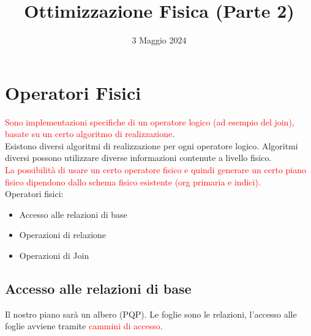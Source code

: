 \documentclass[12pt]{article}
\title{Ottimizzazione Fisica (Parte 2)}
\date{3 Maggio 2024}
\begin{document}
\maketitle
\section{Operatori Fisici}
\textcolor{red}{Sono implementazioni specifiche di un operatore
logico (ad esempio del join), basate su un certo
algoritmo di realizzazione}.\\ Esistono diversi algoritmi di realizzazione per ogni operatore logico. Algoritmi diversi possono utilizzare diverse informazioni contenute a livello fisico.\\
\textcolor{red}{La possibilità di usare un certo operatore fisico e quindi generare un certo piano fisico dipendono dallo schema fisico esistente (org primaria e indici).}\\
Operatori fisici:
\begin{itemize}
    \item Accesso alle relazioni di base
    \item Operazioni di relazione
    \item Operazioni di Join
\end{itemize}
\subsection{Accesso alle relazioni di base}
Il nostro piano sarà un albero (PQP). Le foglie sono le relazioni, l'accesso alle foglie avviene tramite \textcolor{red}{cammini di accesso}.
\end{document}
